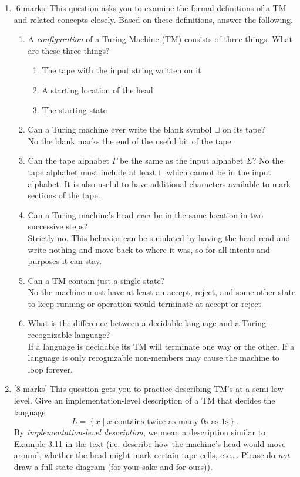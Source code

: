\documentclass{article}
\newcommand{\set}[1]{{\left\{#1\right\}}}    %
\begin{document}
\begin{enumerate}
    \item {[6 marks]} This question asks you to examine the formal definitions of a TM and related concepts closely. Based on these definitions, answer the following.
        \begin{enumerate}
            \item A \emph{configuration} of a Turing Machine (TM) consists of three things. What are these three things? \\
            \begin{enumerate}
            \item The tape with the input string written on it
            \item A starting location of the head
            \item The starting state
            \end{enumerate}
            \item Can a Turing machine ever write the blank symbol $\sqcup$ on its tape? \\
            No the blank marks the end of the useful bit of the tape
            \item Can the tape alphabet $\Gamma$ be the same as the input alphabet $\Sigma$? No the tape alphabet must include at least $\sqcup$ which cannot be in the input alphabet. It is also useful to have additional characters available to mark sections of the tape.
            \item Can a Turing machine's head \emph{ever} be in the same location in two successive steps?\\
            Strictly no. This behavior can be simulated by having the head read and write nothing and move back to where it was, so for all intents and purposes it can stay.
            \item Can a TM contain just a single state?\\
            No the machine must have at least an accept, reject, and some other state to keep running or operation would terminate at accept or reject
            \item What is the difference between a decidable language and a Turing-recognizable language?\\
            If a language is decidable its TM will terminate one way or the other. If a language is only recognizable non-members may cause the machine to loop forever.
        \end{enumerate}
    \item {[8 marks]} This question gets you to practice describing TM's at a semi-low level. Give an implementation-level description of a TM that decides the language \[L=\set{x\mid x\text{ contains twice as many 0s as 1s}}.\] By \emph{implementation-level description}, we mean a description similar to Example 3.11 in the text (i.e. describe how the machine's head would move around, whether the head might mark certain tape cells, etc\ldots. Please do \emph{not} draw a full state diagram (for your sake and for ours)).\\
    

\end{enumerate}
\end{document}
